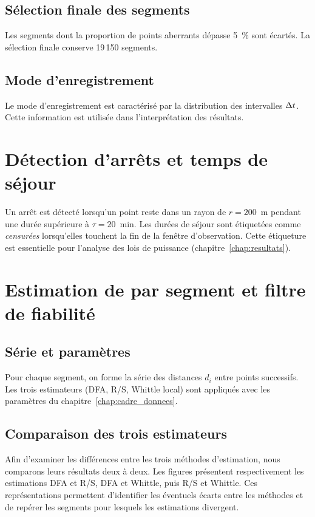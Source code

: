 \subsection{Sélection finale des segments}
Les segments dont la proportion de points aberrants dépasse 5~\% sont écartés. La sélection finale conserve 19\,150 segments.

\subsection{Mode d'enregistrement}
Le mode d'enregistrement est caractérisé par la distribution des intervalles $\Delta t$. Cette information est utilisée dans l'interprétation des résultats.

\section{Détection d'arrêts et temps de séjour}
\label{sec:arrets}
Un arrêt est détecté lorsqu'un point reste dans un rayon de $r = 200$~m pendant une durée supérieure à $\tau = 20$~min. Les durées de séjour sont étiquetées comme \emph{censurées} lorsqu'elles touchent la fin de la fenêtre d'observation. Cette étiqueture est essentielle pour l'analyse des lois de puissance (chapitre~\ref{chap:resultats}).

\section{Estimation de \Hurst{} par segment et filtre de fiabilité}
\label{sec:filtre}

\subsection{Série et paramètres}
Pour chaque segment, on forme la série des distances $d_i$ entre points successifs. Les trois estimateurs (DFA, R/S, Whittle local) sont appliqués avec les paramètres du chapitre~\ref{chap:cadre_donnees}.

\subsection{Comparaison des trois estimateurs}

Afin d'examiner les différences entre les trois méthodes d'estimation,
nous comparons leurs résultats deux à deux. Les figures présentent
respectivement les estimations DFA et R/S, DFA et Whittle, puis R/S
et Whittle. Ces représentations permettent d'identifier les éventuels
écarts entre les méthodes et de repérer les segments pour lesquels
les estimations divergent.

